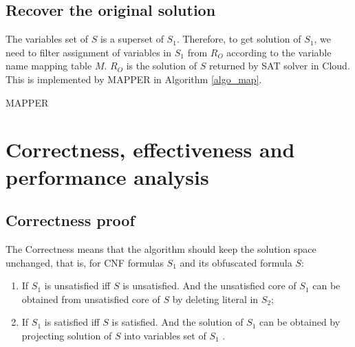 \documentclass[runningheads,a4paper]{llncs}
\begin{document}
\subsection{Recover the original solution}\label{mappping}

The variables set of $S$ is a superset of $S_1$.
Therefore, 
to get solution of $S_1$,
we need to filter assignment of variables in $S_1$ from $R_O$ according to the variable name mapping table $M$.
$R_O$  is the solution of $S$
returned by SAT solver in Cloud. 
This is implemented by MAPPER in Algorithm \ref{algo_map}.


\begin{algorithm}
\caption{MAPPER}
\label{algo_map}
\end{algorithm}






\section{Correctness, effectiveness and performance analysis}\label{correct}



% 
\subsection{Correctness proof}
The Correctness means that the algorithm should keep the solution space unchanged, 
that is, 
for CNF formulas $S_1$  and its obfuscated formula $S$:
\begin{enumerate}
 \item If $S_1$  is unsatisfied iff $S$ is unsatisfied.
 And the unsatisfied core of $S_1$  can be obtained from unsatisfied core of $S$ by deleting literal in $S_2$;
 \item If $S_1$  is satisfied iff $S$ is satisfied.
 And the solution of $S_1$  can be obtained by projecting solution of $S$ into variables set of $S_1$ . 
\end{enumerate}
\end{document}
